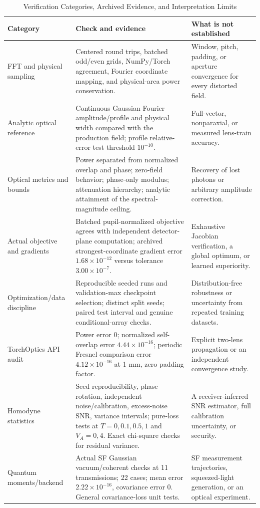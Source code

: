 \documentclass[journal]{IEEEtran}
\begin{document}
\begin{table}[!t]
\caption{Verification Categories, Archived Evidence, and Interpretation Limits}
\label{tab:verification}
\centering\footnotesize
\begin{tabular}{p{}p{}p{}}
\toprule
Category & Check and evidence & What is not established\\
\midrule
FFT and physical sampling & Centered round trips, batched odd/even grids, NumPy/Torch agreement, Fourier coordinate mapping, and physical-area power conservation. & Window, pitch, padding, or aperture convergence for every distorted field.\\
Analytic optical reference & Continuous Gaussian Fourier amplitude/profile and physical width compared with the production field; profile relative-error test threshold $10^{-10}$. & Full-vector, nonparaxial, or measured lens-train accuracy.\\
Optical metrics and bounds & Power separated from normalized overlap and phase; zero-field behavior; phase-only modulus; attenuation hierarchy; analytic attainment of the spectral-magnitude ceiling. & Recovery of lost photons or arbitrary amplitude correction.\\
Actual objective and gradients & Batched pupil-normalized objective agrees with independent detector-plane computation; archived strongest-coordinate gradient error $1.68\times10^{-12}$ versus tolerance $3.00\times10^{-7}$. & Exhaustive Jacobian verification, a global optimum, or learned superiority.\\
Optimization/data discipline & Reproducible seeded runs and validation-max checkpoint selection; distinct split seeds; paired test interval and genuine conditional-array checks. & Distribution-free robustness or uncertainty from repeated training datasets.\\
TorchOptics API audit & Power error 0; normalized self-overlap error $4.44\times10^{-16}$; periodic Fresnel comparison error $4.12\times10^{-16}$ at 1 mm, zero padding factor. & Explicit two-lens propagation or an independent convergence study.\\
Homodyne statistics & Seed reproducibility, phase rotation, independent noise/calibration, excess-noise SNR, variance intervals; pure-loss tests at $T=0,0.1,0.5,1$ and $V_A=0,4$. Exact chi-square checks for residual variance. & A receiver-inferred SNR estimator, full calibration uncertainty, or security.\\
Quantum moments/backend & Actual SF Gaussian vacuum/coherent checks at 11 transmissions; 22 cases; mean error $2.22\times10^{-16}$, covariance error 0. General covariance-loss unit tests. & SF measurement trajectories, squeezed-light generation, or an optical experiment.\\

\end{tabular}
\end{table}
\end{document}
